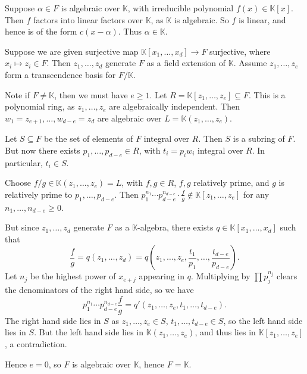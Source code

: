 \documentclass[12pt]{article}
\begin{document}
\begin{proofbox}
	Suppose $\alpha \in F$ is algebraic over $\mathbb{K}$, with irreducible polynomial $f(x) \in \mathbb{K}[x]$. Then $f$ factors into linear factors over $\mathbb{K}$, as $\mathbb{K}$ is algebraic. So $f$ is linear, and hence is of the form $c(x - \alpha)$. Thus $\alpha \in \mathbb{K}$.

	Suppose we are given surjective map $\mathbb{K}[x_1, \ldots, x_d] \to F$ surjective, where $x_i \mapsto z_i \in F$. Then $z_1, \ldots, z_d$ generate $F$ as a field extension of $\mathbb{K}$. Assume $z_1, \ldots, z_e$ form a transcendence basis for $F / \mathbb{K}$.

	Note if $F \neq \mathbb{K}$, then we must have $e \geq 1$. Let $R = \mathbb{K}[z_1, \ldots, z_e] \subseteq F$. This is a polynomial ring, as $z_1, \ldots, z_e$ are algebraically independent. Then $w_1 = z_{e+1}, \ldots, w_{d-e} = z_d$ are algebraic over $L = \mathbb{K}(z_1, \ldots, z_e)$.

	Let $S \subseteq F$ be the set of elements of $F$ integral over $R$. Then $S$ is a subring of $F$. But now there exists $p_1, \ldots, p_{d-e} \in R$, with $t_i = p_i w_i$ integral over $R$. In particular, $t_i \in S$.

	Choose $f/g \in \mathbb{K}(z_1, \ldots, z_e) = L$, with $f, g \in R$, $f, g$ relatively prime, and $g$ is relatively prime to $p_1, \ldots, p_{d-e}$. Then $p_1^{n_1} \cdots p_{d-e}^{n_{d-e}} \cdot \frac{f}{g} \not \in \mathbb{K}[z_1, \ldots, z_e]$ for any $n_1, \ldots, n_{d - e} \geq 0$.

	But since $z_1, \ldots, z_d$ generate $F$ as a $\mathbb{K}$-algebra, there exists $q \in \mathbb{K}[x_1, \ldots, x_d]$ such that
	\[
	\frac{f}{g} = q(z_1, \ldots, z_d) = q\left(z_1, \ldots, z_e, \frac{t_1}{p_1}, \ldots, \frac{t_{d-e}}{p_{d-e}} \right).
	\]
	Let $n_j$ be the highest power of $x_{e+j}$ appearing in $q$. Multiplying by $\prod p_j^{n_j}$ clears the denominators of the right hand side, so we have
	\[
	p_1^{n_1} \cdots p_{d-e}^{n_{d-e}} \frac{f}{g} = q'(z_1, \ldots, z_e, t_1, \ldots, t_{d-e}).
	\]
	The right hand side lies in $S$ as $z_1, \ldots, z_e \in S$, $t_1, \ldots, t_{d-e} \in S$, so the left hand side lies in $S$. But the left hand side lies in $\mathbb{K}(z_1, \ldots, z_e)$, and thus lies in $\mathbb{K}[z_1, \ldots, z_e]$, a contradiction.

	Hence $e = 0$, so $F$ is algebraic over $\mathbb{K}$, hence $F = \mathbb{K}$.
\end{proofbox}
\end{document}
